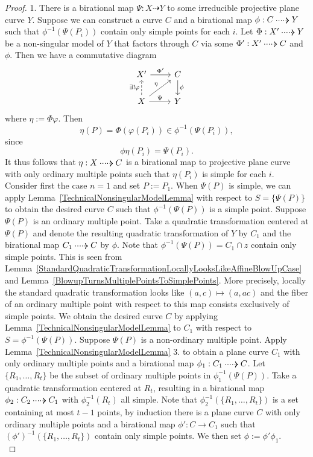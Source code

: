     \begin{proof}
        1. There is a birational map $\Psi : X \dashrightarrow Y$ to some irreducible projective plane curve $Y$. Suppose we can construct a curve $C$ and a birational map $\phi : C\dottedarrow Y$ such that $\phi^{-1}(\Psi(P_i))$ contain only simple points for each $i$. Let $\Phi : X'\dottedarrow Y$ be a non-singular model of $Y$ that factors through $C$ via some $\Phi' : X'\dottedarrow C$ and $\phi$. Then we have a commutative diagram
        $$
            \begin{tikzcd}
                X' \arrow[r,"\Phi'"] & C\arrow[d,"\phi"] \\
                X \arrow[u,dashrightarrow, "\exists! \varphi"] \arrow[ru,"\eta"] \arrow[r,"\Psi"] & Y 
            \end{tikzcd}
        $$ 
        where $\eta := \Phi\varphi$. Then 
        $$
            \eta(P) = \Phi(\varphi(P_i)) \in \phi^{-1}(\Psi(P_i)),
        $$
        since 
        $$
            \phi\eta(P_i) = \Psi(P_i).
        $$
        It thus follows that $\eta : X\dottedarrow C$ is a birational map to projective plane curve with only ordinary multiple points such that $\eta(P_i)$ is simple for each $i$.\\
        Consider first the case $n=1$ and set $P:= P_1$. When $\Psi(P)$ is simple, we can apply Lemma~\ref{TechnicalNonsingularModelLemma} with respect to $S=\{\Psi(P)\}$ to obtain the desired curve $C$ such that $\phi^{-1}(\Psi(P))$ is a simple point. Suppose $\Psi(P)$ is an ordinary multiple point. Take a quadratic transformation centered at $\Psi(P)$ and denote the resulting quadratic transformation of $Y$ by $C_1$ and the birational map $C_1\dottedarrow C$ by $\phi$. Note that $\phi^{-1}(\Psi(P)) = C_1\cap z$ contain only simple points. This is seen from Lemma~\ref{StandardQuadraticTransformationLocallyLooksLikeAffineBlowUpCase} and Lemma~\ref{BlowupTurnsMultiplePointsToSimplePoints}. More precisely, locally the standard quadratic transformation looks like $(a,c)\mapsto (a,ac)$ and the fiber of an ordinary multiple point with respect to this map consists exclusively of simple points. We obtain the desired curve $C$ by applying Lemma~\ref{TechnicalNonsingularModelLemma} to $C_1$ with respect to $S = \phi^{-1}(\Psi(P))$. Suppose $\Psi(P)$ is a non-ordinary multiple point. Apply Lemma~\ref{TechnicalNonsingularModelLemma} 3. to obtain a plane curve $C_1$ with only ordinary multiple points and a birational map $\phi_1 : C_1\dottedarrow C$. Let $\{R_1,\dots,R_t\}$ be the subset of ordinary multiple points in $\phi_1^{-1}(\Psi(P))$. Take a quadratic transformation centered at $R_t$, resulting in a birational map $\phi_2 : C_2\dottedarrow C_1$ with $\phi_2^{-1}(R_t)$ all simple. Note that $\phi_2^{-1}(\{R_1,\dots,R_t\})$ is a set containing at most $t-1$ points, by induction there is a plane curve $C$ with only ordinary multiple points and a birational map $\phi' : C\rightarrow C_1$ such that $(\phi')^{-1}(\{R_1,\dots,R_t\})$ contain only simple points. We then set $\phi := \phi'\phi_1$.\\

\end{proof}
